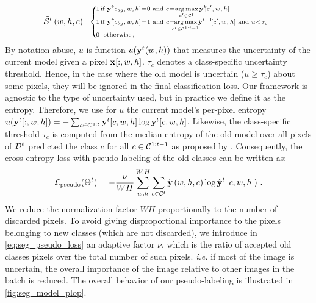 \begin{equation}
    \scriptsize
    \tilde \mcS^{t}\left(w,h,c\right)\mkern-5mu = \mkern-5mu \left\{\begin{array}{ll}
        \mkern-14mu 1 \mkern-27mu & \mkern-8mu \text { if } \vy^{t} \mkern-4mu [c_{bg},w,h]\mkern-4mu = \mkern-4mu 0 \text { and } c \mkern-4mu = \mkern-4mu \argmax \limits_{c' \in \mcC^{t}} \vy^{t} \mkern-4mu [c',w,h]                                                                          \\
        \mkern-14mu 1 \mkern-27mu & \mkern-8mu \text { if } \vy^{t} \mkern-4mu [c_{bg},w,h] \mkern-4mu = \mkern-4mu 1 \text { and } c \mkern-4mu = \mkern-12mu \argmax \limits_{c' \in \mcC^{1:t-1}} \mkern-6mu \hat \vy^{t-1} \mkern-4mu [c',w,h]  \text{ and } u \mkern-4mu < \mkern-4mu \tau_{c} \\
        \mkern-14mu 0 \mkern-27mu & \mkern-4mu \,\text { otherwise\,, }                                                                                                                                                                                                                             \\
    \end{array}\right.
    \label{eq:seg_pseudo_bis_uncertain}
\end{equation}
%
By notation abuse, $u$ is function $u(\mathbf{y}^t(w, h))$ that measures the uncertainty of the current
model given a pixel $\mathbf{x}[:,w,h]$. $\tau_{c}$ denotes a class-specific uncertainty threshold. Hence,
in the case where the old model is uncertain ($u \ge \tau_c$) about some pixels, they will be
ignored in the final classification loss. Our framework is agnostic to the type of uncertainty used,
but in practice we define it as the entropy. Therefore, we use for $u$ the current model's per-pixel
entropy $u(\mathbf{y}^t[:,w, h]) = -\sum_{c \in C^{1:t}} \mathbf{y}^t[c,w, h] \log \mathbf{y}^t[c,w, h]$. Likewise, the
class-specific threshold $\tau_c$ is computed from the median entropy of the old model over all
pixels of $\mathcal{D}^t$ predicted the class $c$ for all $c \in \mathcal{C}^{1:t-1}$ as proposed by
\citet{saporta2020esl}. Consequently, the cross-entropy loss with pseudo-labeling of the old classes
can be written as:
%
\begin{equation}
    \mathcal{L}_\text{pseudo}(\Theta^t)=- \frac{\nu}{WH} \sum_{w,h}^{W,H} \sum_{c \in \mathcal{C}^{t}} \tilde {\mathbf{y}}\left(w,h,c\right) \log \hat {\mathbf{y}}^{t}\left[c,w,h]\right)\,.
    \label{eq:seg_pseudo_loss}
\end{equation}
%
We reduce the normalization factor $WH$ proportionally to the number of discarded pixels. To avoid
giving disproportional importance to the pixels belonging to new classes (which are not discarded),
we introduce in \autoref{eq:seg_pseudo_loss} an adaptive factor $\nu$, which is the ratio of
accepted old classes pixels over the total number of such pixels. \textit{i.e.} if most of the image
is uncertain, the overall importance of the image relative to other images in the batch is reduced.
The overall behavior of our pseudo-labeling is illustrated in \autoref{fig:seg_model_plop}.

